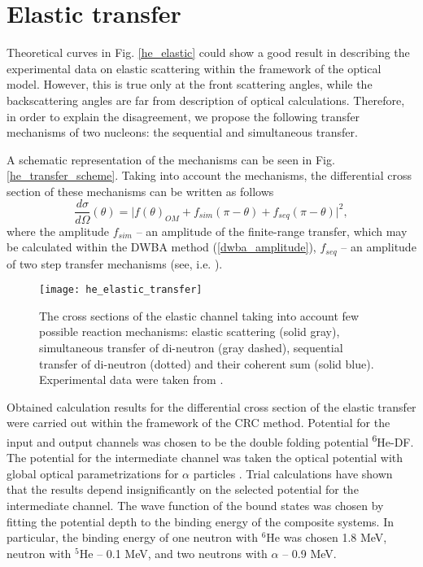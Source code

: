 \documentclass[
12pt, %
oneside, %
english, %
onehalfspacing, %
onehalfspacing, %
headsepline, %
]{MastersDoctoralThesis} %
\newcommand{\he}{\textsuperscript{6}He\xspace}
\begin{document}
\section{Elastic transfer}
Theoretical curves in Fig. \ref{he_elastic} could  show a good result in describing the experimental data on elastic scattering within the framework of the optical model. However, this is true only at the front scattering angles, while the backscattering angles are far from description of optical calculations. Therefore, in order to explain the disagreement, we propose the following transfer mechanisms of two nucleons: the sequential and simultaneous transfer.

 A schematic representation of the mechanisms can be seen in Fig. \ref{he_transfer_scheme}. Taking into account the mechanisms, the differential cross section of these mechanisms can be written as follows
\begin{equation}
\dfrac{d\sigma}{d\Omega}(\theta) =
 \vert f(\theta)_{OM} + f_{sim}(\pi - \theta)+ f_{seq}(\pi - \theta)  \vert^2,
\label{eq:he_cs}
\end{equation}
where the amplitude $f_{sim}$ -- an amplitude of the finite-range transfer, which may be calculated within the DWBA method (\ref{dwba_amplitude}), $f_{seq}$ -- an amplitude of two step transfer mechanisms (see, i.e. \cite{satchler1983, fresco}).

\begin{figure}[tp]
\centering
\texttt{[image: he\_elastic\_transfer]} 
\decoRule
\caption{  \footnotesize  The cross sections of the elastic channel taking into account few possible reaction mechanisms: elastic scattering (solid gray), simultaneous transfer of di-neutron (gray dashed), sequential transfer of di-neutron (dotted) and their coherent sum (solid blue). Experimental data were taken from \cite{oganessian1999dynamics}.
}
\label{he_elastic_transfer}
\end{figure}

Obtained calculation results for the differential cross section of the elastic transfer were carried out within the framework of the CRC method. Potential for the input and output channels was chosen to be the double folding potential \he-DF. The potential for the intermediate channel was taken the optical potential with global optical parametrizations for $\alpha$ particles \cite{avrigeanu1994global}. Trial calculations have shown that the results depend insignificantly on the selected potential for the intermediate channel.
The wave function of the bound states was chosen by fitting the potential depth to the binding energy of the composite systems. 
In particular, the binding energy of one neutron with $^6$He was chosen 1.8 MeV,  neutron with $^5$He -- 0.1 MeV, and two neutrons with  $\alpha$  -- 0.9 MeV. 
\end{document}
